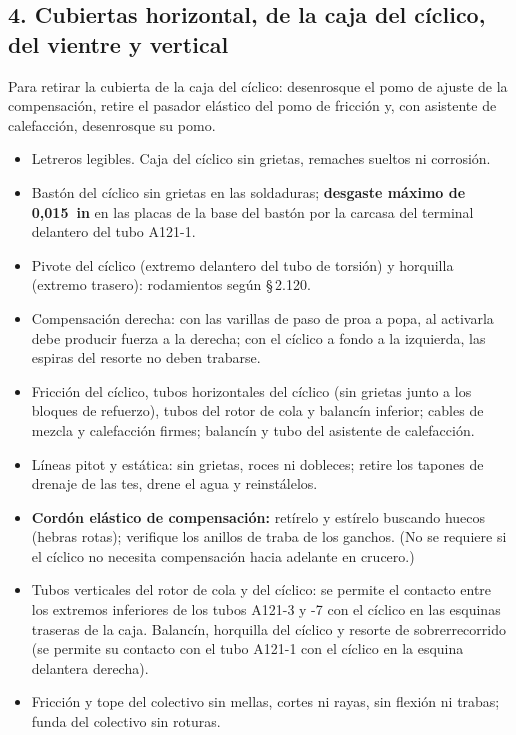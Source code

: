 \subsection*{4. Cubiertas horizontal, de la caja del cíclico, del vientre y vertical}
Para retirar la cubierta de la caja del cíclico: desenrosque el pomo de ajuste de la compensación, retire el pasador elástico del pomo de fricción y, con asistente de calefacción, desenrosque su pomo.
\begin{itemize}
\item Letreros legibles. Caja del cíclico sin grietas, remaches sueltos ni corrosión.
\item Bastón del cíclico sin grietas en las soldaduras; \textbf{desgaste máximo de 0,015~in} en las placas de la base del bastón por la carcasa del terminal delantero del tubo A121-1.
\item Pivote del cíclico (extremo delantero del tubo de torsión) y horquilla (extremo trasero): rodamientos según \S\,2.120.
\item Compensación derecha: con las varillas de paso de proa a popa, al activarla debe producir fuerza a la derecha; con el cíclico a fondo a la izquierda, las espiras del resorte no deben trabarse.
\item Fricción del cíclico, tubos horizontales del cíclico (sin grietas junto a los bloques de refuerzo), tubos del rotor de cola y balancín inferior; cables de mezcla y calefacción firmes; balancín y tubo del asistente de calefacción.
\item Líneas pitot y estática: sin grietas, roces ni dobleces; retire los tapones de drenaje de las tes, drene el agua y reinstálelos.
\item \textbf{Cordón elástico de compensación:} retírelo y estírelo buscando huecos (hebras rotas); verifique los anillos de traba de los ganchos. (No se requiere si el cíclico no necesita compensación hacia adelante en crucero.)
\item Tubos verticales del rotor de cola y del cíclico: se permite el contacto entre los extremos inferiores de los tubos A121-3 y -7 con el cíclico en las esquinas traseras de la caja. Balancín, horquilla del cíclico y resorte de sobrerrecorrido (se permite su contacto con el tubo A121-1 con el cíclico en la esquina delantera derecha).
\item Fricción y tope del colectivo sin mellas, cortes ni rayas, sin flexión ni trabas; funda del colectivo sin roturas.
\end{itemize}

